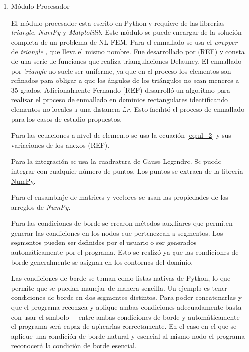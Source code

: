 			\begin{enumerate}
				\item Módulo Procesador

				El módulo procesador esta escrito en Python y requiere de las librerías \textit{triangle}, \textit{NumPy} y \textit{Matplotilib}. Este módulo se puede encargar de la solución completa de un problema de NL-FEM.
				Para el enmallado se usa el \textit{wrapper} de \textit{triangle} \parencite{triangle}, que lleva el mismo nombre. Fue desarrollado por (REF) y consta de una serie de funciones que realiza triangulaciones Delauney. El enmallado por \textit{triangle} no suele ser uniforme, ya que en el proceso los elementos son refinados para obligar a que los ángulos de los triángulos no sean menores a 35 grados.
				Adicionalmente Fernando (REF) desarrolló un algoritmo para realizar el proceso de enmallado en dominios rectangulares identificando elementos no locales a una distancia $Lr$. Esto facilitó el proceso de enmallado para los casos de estudio propuestos.

				Para las ecuaciones a nivel de elemento se usa la ecuación \ref{eq:nl_2} y sus variaciones de los anexos (REF).

				Para la integración se usa la cuadratura de Gauss Legendre. Se puede integrar con cualquier número de puntos. Los puntos se extraen de la librería \href{https://numpy.org/doc/stable/reference/generated/numpy.polynomial.legendre.leggauss.html}{NumPy}.

				Para el ensamblaje de matrices y vectores se usan las propiedades de los arreglos de \textit{NumPy}.

				Para las condiciones de borde se crearon métodos auxiliares que permiten generar las condiciones en los nodos que pertenezcan a segmentos. Los segmentos pueden ser definidos por el usuario o ser generados automáticamente por el programa. Esto se realizó ya que las condiciones de borde generalmente se asignan en los contornos del dominio.
				
				Las condiciones de borde se toman como listas nativas de Python, lo que permite que se puedan manejar de manera sencilla. Un ejemplo es tener condiciones de borde en dos segmentos distintos. Para poder concatenarlas y que el programa reconzca y aplique ambas condiciones adecuadamente basta con usar el símbolo + entre ambas condiciones de borde y automáticamente el programa será capaz de aplicarlas correctamente. En el caso en el que se aplique una condición de borde natural y esencial al mismo nodo el programa reconocerá la condición de borde esencial.


\end{enumerate}
